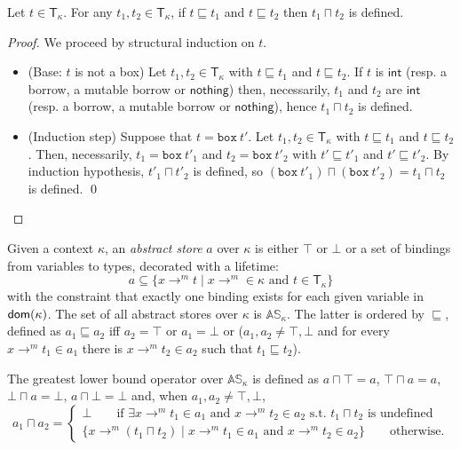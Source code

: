 \begin{lemma}\label{lemma:technical-type}
  Let $t\in\mathsf{T}_\kappa$. For any $t_1,t_2\in\mathsf{T}_\kappa$,
  if $t\sqsubseteq t_1$ and $t\sqsubseteq t_2$ then $t_1\sqcap t_2$ is defined.
\end{lemma}
\begin{proof}
  We proceed by structural induction on $t$.
  \begin{itemize}
    \item (Base: $t$ is not a box)
    Let $t_1,t_2\in\mathsf{T}_\kappa$ with $t\sqsubseteq t_1$ and $t\sqsubseteq t_2$.
    If $t$ is $\mathsf{int}$ (resp. a borrow, a mutable borrow or $\mathsf{nothing}$)
    then, necessarily, $t_1$ and $t_2$ are $\mathsf{int}$ (resp. a borrow,
    a mutable borrow or $\mathsf{nothing}$), hence $t_1\sqcap t_2$ is defined.
    \item (Induction step) Suppose that $t = \mathtt{box}\ t'$.
    Let $t_1,t_2\in\mathsf{T}_\kappa$ with $t\sqsubseteq t_1$ and $t\sqsubseteq t_2$.
    Then, necessarily, $t_1 = \mathtt{box}\ t'_1$ and $t_2 = \mathtt{box}\ t'_2$
    with $t'\sqsubseteq t'_1$ and $t'\sqsubseteq t'_2$. By induction
    hypothesis, $t'_1\sqcap t'_2$ is defined, so
    $(\mathtt{box}\ t'_1) \sqcap (\mathtt{box}\ t'_2) = t_1 \sqcap t_2$ is defined.
    \qed
  \end{itemize}
\end{proof}

\begin{definition}
  \label{def:abstract-store}
  Given a context $\kappa$, an \emph{abstract store} $a$ over $\kappa$ is either $\top$ or $\bot$
  or a set of bindings from variables to types, decorated with a lifetime:
  \[
  a\subseteq\{x\to^m t\mid x\to^m\in\kappa\text{ and }t\in\mathsf{T_\kappa}\}
  \]
  with the constraint that exactly one binding exists for each given variable in $\mathsf{dom}(\kappa)$.
  The set of all abstract stores over $\kappa$ is $\mathbb{AS}_\kappa$.
  The latter is ordered by $\sqsubseteq$, defined as $a_1\sqsubseteq a_2$ iff $a_2=\top$ or
  $a_1=\bot$ or
  ($a_1,a_2\not=\top,\bot$ and for every $x\to^mt_1\in a_1$ there is $x\to^mt_2\in a_2$
  such that $t_1\sqsubseteq t_2$).
\end{definition}

\begin{definition}
  The greatest lower bound operator over $\mathbb{AS}_\kappa$ is defined as
  $a\sqcap\top=a$, $\top\sqcap a=a$, $\bot\sqcap a=\bot$, $a\sqcap \bot=\bot$
  and, when $a_1,a_2\not=\top,\bot$,
  \[
  a_1\sqcap a_2=\begin{cases}
  \bot\qquad\text{if $\exists x\to^m t_1\in a_1$ and $x\to^m t_2\in a_2$ s.t.\ $t_1\sqcap t_2$ is undefined}\\
  \{x\to^m(t_1\sqcap t_2)\mid x\to^m t_1\in a_1\text{ and }x\to^m t_2\in a_2\}\qquad\text{otherwise.}
  \end{cases}
  \]
\end{definition}

